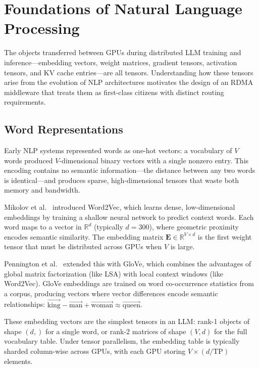 \documentclass[11pt,letterpaper]{article}
\theoremstyle{definition}
\begin{document}
\section{Foundations of Natural Language Processing}
\label{sec:nlp-foundations}

The objects transferred between GPUs during distributed LLM training and inference---embedding vectors, weight matrices, gradient tensors, activation tensors, and KV cache entries---are all tensors. Understanding how these tensors arise from the evolution of NLP architectures motivates the design of an RDMA middleware that treats them as first-class citizens with distinct routing requirements.

\subsection{Word Representations}

Early NLP systems represented words as one-hot vectors: a vocabulary of $V$ words produced $V$-dimensional binary vectors with a single nonzero entry. This encoding contains no semantic information---the distance between any two words is identical---and produces sparse, high-dimensional tensors that waste both memory and bandwidth.

Mikolov et al.~\cite{mikolov2013word2vec} introduced Word2Vec, which learns dense, low-dimensional embeddings by training a shallow neural network to predict context words. Each word maps to a vector in $\mathbb{R}^d$ (typically $d = 300$), where geometric proximity encodes semantic similarity. The embedding matrix $\mathbf{E} \in \mathbb{R}^{V \times d}$ is the first weight tensor that must be distributed across GPUs when $V$ is large.

Pennington et al.~\cite{pennington2014glove} extended this with GloVe, which combines the advantages of global matrix factorization (like LSA) with local context windows (like Word2Vec). GloVe embeddings are trained on word co-occurrence statistics from a corpus, producing vectors where vector differences encode semantic relationships: $\vec{\text{king}} - \vec{\text{man}} + \vec{\text{woman}} \approx \vec{\text{queen}}$.

These embedding vectors are the simplest tensors in an LLM: rank-1 objects of shape $(d,)$ for a single word, or rank-2 matrices of shape $(V, d)$ for the full vocabulary table. Under tensor parallelism, the embedding table is typically sharded column-wise across GPUs, with each GPU storing $V \times (d / \text{TP})$ elements.
\end{document}
